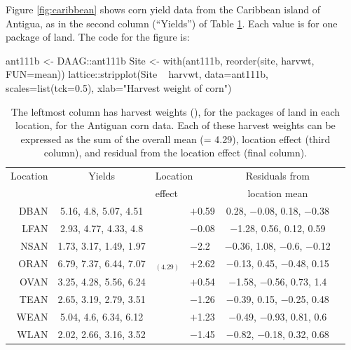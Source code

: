 Figure \ref{fig:caribbean} shows corn yield data from the Caribbean island of
Antigua, as in the second column (``Yields'') of Table \ref{tab:ant111b}.
Each value is for one package of land.
The code for the figure is:
\begin{Schunk}
\begin{Sinput}
ant111b <- DAAG::ant111b
Site <- with(ant111b, reorder(site, harvwt,
                              FUN=mean))
lattice::stripplot(Site ~ harvwt, data=ant111b,
          scales=list(tck=0.5),
          xlab="Harvest weight of corn")
\end{Sinput}
\end{Schunk}

\begin{table}
\begin{center}
{\small
\begin{tabular}{@{}rc||r@{\hspace{1mm}}lcc@{}}
\hline
\multicolumn{1}{c}{Location}  & \multicolumn{1}{c}{Yields}  &
\multicolumn{2}{l}{Location} & Residuals from\\
 & & \multicolumn{2}{l}{effect} & \multicolumn{1}{c}{location mean}\\
\hline
DBAN &  5.16, 4.8, 5.07, 4.51 &  \vline& $+$0.59 & 0.28, $-$0.08, 0.18, $-$0.38 \\
LFAN &  2.93, 4.77, 4.33, 4.8 &  \vline& $-$0.08 &  $-$1.28, 0.56, 0.12, 0.59 \\
NSAN & 1.73, 3.17, 1.49, 1.97 &  \vline& $-$2.2 & $-$0.36, 1.08, $-$0.6, $-$0.12 \\
ORAN & 6.79, 7.37, 6.44, 7.07 & $_{(4.29)} $ \vline& $+$2.62 & $-$0.13, 0.45, $-$0.48, 0.15 \\
OVAN & 3.25, 4.28, 5.56, 6.24 &  \vline& $+$0.54 &  $-$1.58, $-$0.56, 0.73, 1.4 \\
TEAN & 2.65, 3.19, 2.79, 3.51 &  \vline& $-$1.26 & $-$0.39, 0.15, $-$0.25, 0.48 \\
WEAN &  5.04, 4.6, 6.34, 6.12 &  \vline& $+$1.23 &  $-$0.49, $-$0.93, 0.81, 0.6 \\
WLAN & 2.02, 2.66, 3.16, 3.52 &  \vline& $-$1.45 & $-$0.82, $-$0.18, 0.32, 0.68 \\
\hline
\end{tabular}
}
\caption{The leftmost column has harvest weights (), for
  the packages of land in each location, for the Antiguan corn data.  Each of
  these harvest weights can be expressed as the sum of the overall
  mean (= 4.29), location effect (third column), and residual from the
  location effect (final column).
\label{tab:ant111b}}
\end{center}
\vspace*{-0pt}
\end{table}
\vspace*{3pt}


